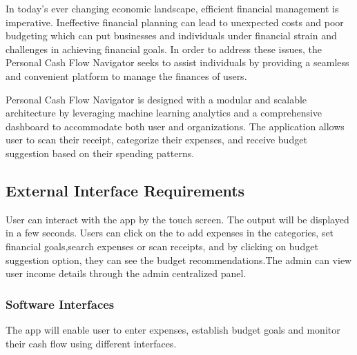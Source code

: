 \documentclass[12pt]{article}
\begin{document}
\vspace{0.5cm} %

\noindent
\normalsize In today's ever changing economic landscape, efficient financial management is imperative. Ineffective financial planning can lead to unexpected costs and poor budgeting which can put businesses and individuals under financial strain and challenges in achieving financial goals. In order to address these issues, the Personal Cash Flow Navigator seeks to assist individuals by
 providing a seamless and convenient platform to manage the finances of users.


Personal Cash Flow Navigator is designed with a modular and scalable architecture by leveraging machine learning analytics and a comprehensive dashboard to accommodate both user and organizations. The application allows user to scan their receipt, categorize their expenses, and receive budget suggestion based on their spending patterns.

\vspace{1cm} %

\noindent
\subsection{External Interface Requirements}

\vspace{0.5 cm} %
\noindent
\normalsize User can interact with the app by the touch screen. The output will be displayed in a few seconds. Users can click on the to add expenses in the categories, set financial goals,search expenses or scan receipts, and by clicking on budget suggestion option, they can see the budget recommendations.The admin can view user income details through the admin centralized panel.\cite{gupta2020expense}

\vspace{1 cm} %

\noindent
\subsubsection{Software Interfaces}

\vspace{0.5 cm} %
\noindent
The app will enable user to  enter expenses, establish budget goals and monitor their cash flow using different interfaces.
\end{document}
